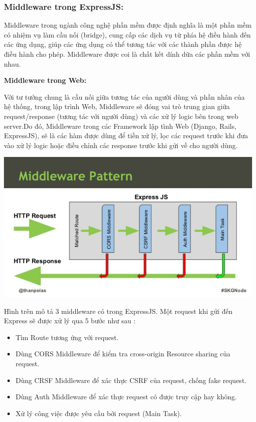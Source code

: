 \subsubsection{Middleware trong ExpressJS:}

Middleware trong ngành công nghệ phần mềm được định nghĩa là một phần mềm có nhiệm vụ làm cầu nối (bridge), cung cấp các dịch vụ từ phía hệ điều hành đến các ứng dụng, giúp các ứng dụng có thể tương tác với các thành phần được hệ điều hành cho phép. Middleware được coi là chất kết dính dữa các phần mềm với nhau.

\textbf{Middleware trong Web:} 

Với tư tưởng chung là cầu nối giữa tương tác của người dùng và phần nhân của hệ thống, trong lập trình Web, Middleware sẽ đóng vai trò trung gian giữa request/response (tương tác với người dùng) và các xử lý logic bên trong web server.Do đó, Middleware trong các Framework lập tình Web (Django, Rails, ExpressJS), sẽ là các hàm được dùng để tiền xử lý, lọc các request trước khi đưa vào xử lý logic hoặc điều chỉnh các response trước khi gửi về cho người dùng.

\begin{center}
  \captionsetup{type=figure}
  \includegraphics[width=15cm]{img/expressjsmiddleware.jpg}
\end{center}

Hình trên mô tả 3 middleware có trong ExpressJS. Một request khi gửi đến Express sẽ được xử lý qua 5 bước như sau :
\begin{itemize}
  \item Tìm Route tương ứng với request.
  \item Dùng CORS Middleware để kiểm tra cross-origin Resource sharing của request.
  \item Dùng CRSF Middleware để xác thực CSRF của request, chống fake request.
  \item Dùng Auth Middleware để xác thực request có được truy cập hay không.
  \item Xử lý công việc được yêu cầu bởi request (Main Task).
\end{itemize}

